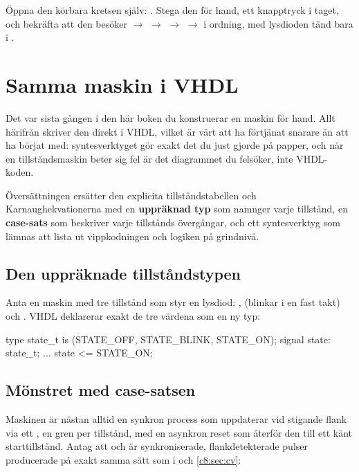 Öppna den körbara kretsen själv: . Stega den
för hand, ett knapptryck i taget, och bekräfta att den besöker
 $\to$  $\to$  $\to$  $\to$
 i
ordning, med lysdioden tänd bara i .

\section{Samma maskin i VHDL}
\label{c8:sec:vhdl}

Det var sista gången i den här boken du konstruerar en maskin för hand. Allt härifrån skriver den
direkt i VHDL, vilket är värt att ha förtjänat snarare än att ha börjat med: syntesverktyget gör
exakt det du just gjorde på papper, och när en tillståndsmaskin beter sig fel är det diagrammet du
felsöker, inte VHDL-koden.

Översättningen ersätter den explicita tillståndstabellen och Karnaughekvationerna med en
\textbf{uppräknad typ} som namnger varje tillstånd, en \textbf{case-sats} som beskriver varje
tillstånds övergångar, och ett syntesverktyg som lämnas att lista ut vippkodningen och logiken på
grindnivå.

\subsection*{Den uppräknade tillståndstypen}
Anta en maskin med tre tillstånd som styr en lysdiod: ,  (blinkar
i en fast takt) och . VHDL deklarerar exakt de tre värdena som en ny typ:

\begin{vhdlcode}
type state_t is (STATE_OFF, STATE_BLINK, STATE_ON);
signal state: state_t;
...
state <= STATE_ON;
\end{vhdlcode}

\subsection*{Mönstret med case-satsen}
Maskinen är nästan alltid en synkron process som uppdaterar  vid stigande flank via ett
, en gren per tillstånd, med en asynkron reset som återför den till ett känt
starttillstånd. Antag att  och  är synkroniserade,
flankdetekterade pulser producerade på exakt samma sätt som  i  och
\ref{c8:sec:cv}:


